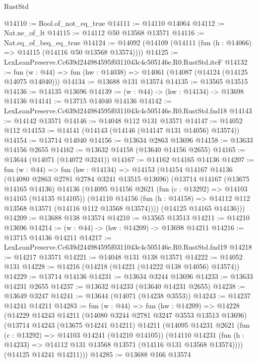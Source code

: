 \begin{lexlean}{RustStd}
\begin{coremodule}
@14110 := Bool.of_not_eq_true
@14111 := @14110 @14064
@14112 := Nat.ne_of_lt
@14115 := @14112 @50 @13568 @13571
@14116 := Nat.eq_of_beq_eq_true
@14124 := @14092 (@14109 (@14111 (fun (h : @14066) => @14115 (@14116 @50 @13568 @13574))))
@14125 := LexLeanPreserve.Cc639d244984595f0311043c4c505146e.R0.RustStd.iteF
@14132 := fun (w : @44) => fun (hw : @14038) => @14061 (@14087 (@14124 (@14125 @14075 @14040)))
@14134 := @13688 @131 @13574
@14135 := @13565 @13515
@14136 := @14135 @13696
@14139 := (w : @44) -> (hw : @14134) -> @13698 @14136
@14141 := @13715 @14040 @14136
@14142 := LexLeanPreserve.Cc639d244984595f0311043c4c505146e.R0.RustStd.fnd18
@14143 := @14142 @13571
@14146 := @14048 @112 @131 @13571
@14147 := @14052 @112
@14153 := @14141 (@14143 (@14146 (@14147 @131 @14056) @13574))
@14154 := @13714 @14040
@14156 := @13634 @2863 @13696
@14158 := @13633 @14156 @2655
@14162 := @13632 @14158 (@13640 @14156 @2655)
@14165 := @13644 (@14071 (@14072 @3241))
@14167 := @14162 @14165 @14136
@14207 := fun (w : @44) =>
  fun (hw : @14134) =>
  @14153
    (@14154
      @14167
      @14136
      (@14080 @2863 @2781 @2784 @3241 @13515 @13696)
      (@13714
        @14167
        (@13675 @14165 @14136)
        @14136
        (@14095
          @14156
          @2621
          (fun (c : @13292) => @14103 @14165 (@14135 @14105))
          (@14110
            @14156
            (fun (h : @14158) => @14112 @112 @13568 @13571 (@14116 @112 @13568 @13574))))
        (@14125 @14165 @14136)))
@14209 := @13688 @138 @13574
@14210 := @13565 @13513
@14211 := @14210 @13696
@14214 := (w : @44) -> (hw : @14209) -> @13698 @14211
@14216 := @13715 @14136 @14211
@14217 := LexLeanPreserve.Cc639d244984595f0311043c4c505146e.R0.RustStd.fnd19
@14218 := @14217 @13571
@14221 := @14048 @131 @138 @13571
@14222 := @14052 @131
@14228 := @14216 (@14218 (@14221 (@14222 @138 @14056) @13574))
@14229 := @13714 @14136
@14231 := @13634 @3244 @13696
@14233 := @13633 @14231 @2655
@14237 := @13632 @14233 (@13640 @14231 @2655)
@14238 := @13649 @3247
@14241 := @13644 (@14071 (@14238 @3553))
@14243 := @14237 @14241 @14211
@14283 := fun (w : @44) =>
  fun (hw : @14209) =>
  @14228
    (@14229
      @14243
      @14211
      (@14080 @3244 @2781 @3247 @3553 @13513 @13696)
      (@13714
        @14243
        (@13675 @14241 @14211)
        @14211
        (@14095
          @14231
          @2621
          (fun (c : @13292) => @14103 @14241 (@14210 @14105))
          (@14110
            @14231
            (fun (h : @14233) => @14112 @131 @13568 @13571 (@14116 @131 @13568 @13574))))
        (@14125 @14241 @14211)))
@14285 := @13688 @166 @13574

\end{coremodule}
\end{lexlean}
